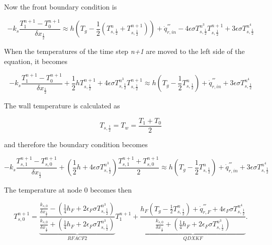 Now the front boundary condition is

\begin{equation}
\label{bc_front_2}
  -k_s \frac{T_1^{n+1}-T_0^{n+1}}{\delta x_{\frac{1}{2}}}
  \approx h(T_g - \frac{1}{2}(T_{s,\frac{1}{2}}^n+T_{s,\frac{1}{2}}^{n+1})) + 
  \dot{q}_{r, in}^{'''}-4\epsilon\sigma T_{s,\frac{1}{2}}^{n^3}T_{s,\frac{1}{2}}^{n+1} + 3\epsilon\sigma T_{s,\frac{1}{2}}^{n^4}
\end{equation}

When the temperatures of the time step \textit{n+1} are moved to the left side of the equation, it becomes

\begin{equation}
\label{bc_front_3}
  -k_s \frac{T_1^{n+1}-T_0^{n+1}}{\delta x_{\frac{1}{2}}} + \frac{1}{2}hT_{s,\frac{1}{2}}^{n+1} + 4\epsilon\sigma T_{s,\frac{1}{2}}^{n^3} T_{s,\frac{1}{2}}^{n+1}
  \approx h(T_g - \frac{1}{2}T_{s,\frac{1}{2}}^n) + 
  \dot{q}_{r, in}^{'''} + 3\epsilon\sigma T_{s,\frac{1}{2}}^{n^4}
\end{equation}

The wall temperature is calculated as

\begin{equation}
\label{T_front}
  T_{s,\frac{1}{2}} = T_w = \frac{T_1+T_0}{2}
\end{equation}

and therefore the boundary condition becomes

\begin{equation}
\label{bc_front_4}
  -k_s \frac{T_{s,1}^{n+1}-T_{s,0}^{n+1}}{\delta x_{\frac{1}{2}}} + (\frac{1}{2}h+ 4\epsilon\sigma T_{s,\frac{1}{2}}^{n^3}) \frac{T_{s,1}^{n+1}+T_{s,0}^{n+1}}{2}
  \approx h(T_g - \frac{1}{2}T_{s,\frac{1}{2}}^n) + 
  \dot{q}_{r, in}^{'''} + 3\epsilon\sigma T_{s,\frac{1}{2}}^{n^4}
\end{equation}

The temperature at node 0 becomes then

\begin{equation}
\label{T0}
  T_{s,0}^{n+1} = \underbrace{\frac{\frac{k_{s,0}}{\delta x_{\frac{1}{2}}}-(\frac{1}{4}h_F+2\epsilon_F \sigma T_{s,\frac{1}{2}}^{n^3})}{\frac{k_{s,0}}{\delta x_{\frac{1}{2}}}+(\frac{1}{4}h_F+2\epsilon_F \sigma T_{s,\frac{1}{2}}^{n^3})}}_{RFACF2} T_1^{n+1}+
 \underbrace{\frac{h_F(T_g-\frac{1}{2}T_{s,\frac{1}{2}}^n)+\dot{q}_{r,F}^{'''}+4\epsilon_F \sigma T_{s,\frac{1}{2}}^{n^4}}{\frac{k_{s,0}}{\delta x_{\frac{1}{2}}}+(\frac{1}{4}h_F+2\epsilon_F \sigma T_{s,\frac{1}{2}}^{n^3})}}_{QDXKF}.
\end{equation}

